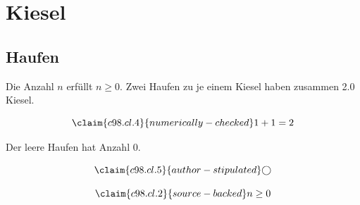 \chapter{Kiesel}\label{c98}
\section{Haufen}\label{c98.s1}

\begin{theorem}[Anzahl]\label{c98.thm.count}
  Die Anzahl $n$ erfüllt $n \geq 0$.
  Zwei Haufen zu je einem Kiesel haben zusammen
  \num[c98.cl.4]{2.0}{} Kiesel.
\end{theorem}

\begin{equation}\label{c98.eq.sum}\claim{c98.cl.4}{numerically-checked}
  1 + 1 = 2
\end{equation}

\begin{lemma}[Leer]\label{c98.lem.empty}
  Der leere Haufen hat Anzahl $0$.
\end{lemma}

\begin{equation}\label{c98.eq.circle}\claim{c98.cl.5}{author-stipulated}
  \bigcirc
\end{equation}

\begin{vertiefung}[id=c98.v1, titel={T}, wozu={W}, voraussetzung={V}, zurueck={Z}]
  \begin{equation}\label{c98.eq.page}\claim{c98.cl.2}{source-backed}
    n \geq 0
  \end{equation}
\end{vertiefung}
